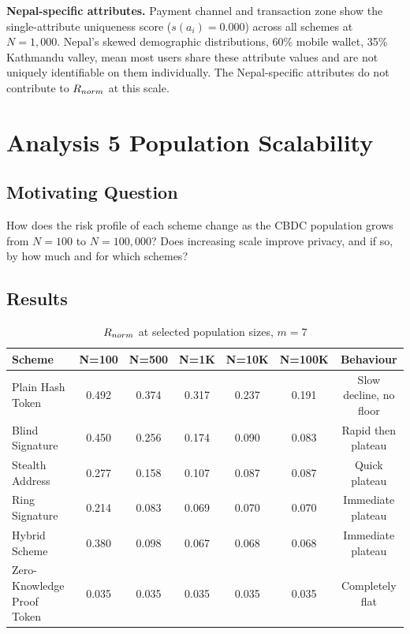 \textbf{Nepal-specific attributes.} Payment channel and
transaction zone show the single-attribute uniqueness score ($s(a_i) = 0.000$) across all schemes at
$N = 1{,}000$. Nepal's skewed demographic distributions,
60\% mobile wallet, 35\% Kathmandu valley, mean most users
share these attribute values and are not uniquely identifiable
on them individually. The Nepal-specific attributes do not
contribute to $R_{norm}$ at this scale.

\section{Analysis 5 Population Scalability}\label{sec:a5}

\subsection{Motivating Question}

How does the risk profile of each scheme change as the CBDC
population grows from $N = 100$ to $N = 100{,}000$? Does
increasing scale improve privacy, and if so, by how much
and for which schemes?

\subsection{Results}

\begin{table}[H]
\centering
\caption{$R_{norm}$ at selected population sizes, $m = 7$}
\label{tab:a5_results}
\begin{tabular}{lcccccc}
\toprule
\textbf{Scheme} & \textbf{N=100} & \textbf{N=500} &
\textbf{N=1K} & \textbf{N=10K} &
\textbf{N=100K} & \textbf{Behaviour}\\
\midrule
Plain Hash Token & 0.492 & 0.374 & 0.317 & 0.237 & 0.191 &
Slow decline, no floor\\
Blind Signature  & 0.450 & 0.256 & 0.174 & 0.090 & 0.083 &
Rapid then plateau\\
Stealth Address  & 0.277 & 0.158 & 0.107 & 0.087 & 0.087 &
Quick plateau\\
Ring Signature   & 0.214 & 0.083 & 0.069 & 0.070 & 0.070 &
Immediate plateau\\
Hybrid Scheme    & 0.380 & 0.098 & 0.067 & 0.068 & 0.068 &
Immediate plateau\\
Zero-Knowledge Proof Token        & 0.035 & 0.035 & 0.035 & 0.035 & 0.035 &
Completely flat\\
\bottomrule
\end{tabular}
\end{table}

